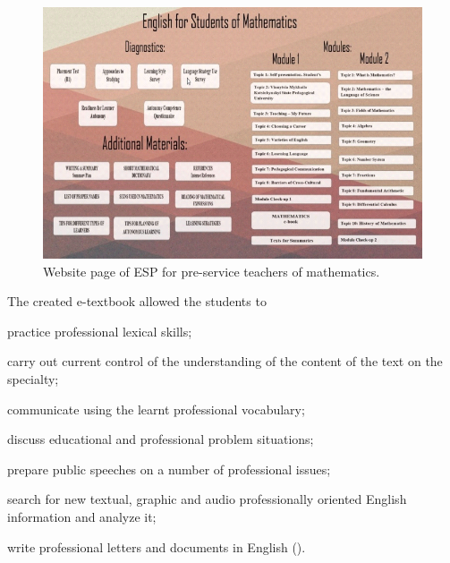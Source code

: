 \begin{figure}[htpb]
\centering
\begin{minipage}{.65\textwidth}
\caption{Website page of ESP for pre-service teachers of mathematics.}	
\label{fig-01}
\includegraphics[width=\textwidth]{figure01}
\end{minipage}
\end{figure}
The created e-textbook allowed the students to \begin{enumerate*}[label=\arabic*)]
	
	\item practice professional
	lexical skills; 
	\item carry out current control of the understanding of the
	content of the text on the specialty; 
	\item communicate using the learnt
	professional vocabulary; 
	\item discuss educational and professional problem
	situations; 
	\item prepare public speeches on a number of professional
	issues; 
	\item search for new textual, graphic and audio professionally
	oriented English information and analyze it; 
	\item write professional
        letters and documents in English ().
\end{enumerate*}

